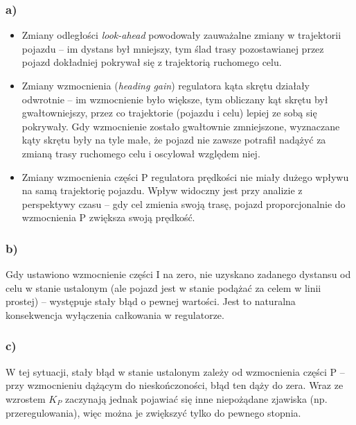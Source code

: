 \documentclass[11pt, a4paper]{article}
\begin{document}
\subsubsection*{a)}

\begin{itemize}
\item Zmiany odległości \emph{look-ahead} powodowały zauważalne zmiany w trajektorii pojazdu -- im dystans był mniejszy, tym ślad trasy pozostawianej przez pojazd dokładniej pokrywał się z trajektorią ruchomego celu.
\item Zmiany wzmocnienia (\emph{heading gain}) regulatora kąta skrętu działały odwrotnie -- im wzmocnienie było większe, tym obliczany kąt skrętu był gwałtowniejszy, przez co trajektorie (pojazdu i celu) lepiej ze sobą się pokrywały. Gdy wzmocnienie zostało gwałtownie zmniejszone, wyznaczane kąty skrętu były na tyle małe, że pojazd nie zawsze potrafił nadążyć za zmianą trasy ruchomego celu i oscylował względem niej.
\item Zmiany wzmocnienia części P regulatora prędkości nie miały dużego wpływu na samą trajektorię pojazdu. Wpływ widoczny jest przy analizie z perspektywy czasu -- gdy cel zmienia swoją trasę, pojazd proporcjonalnie do wzmocnienia P zwiększa swoją prędkość.
\end{itemize}

\subsubsection*{b)}

Gdy ustawiono wzmocnienie części I na zero, nie uzyskano zadanego dystansu od celu w stanie ustalonym (ale pojazd jest w stanie podążać za celem w linii prostej) -- występuje stały błąd o pewnej wartości. Jest to naturalna konsekwencja wyłączenia całkowania w regulatorze.

\subsubsection*{c)}

W tej sytuacji, stały błąd w stanie ustalonym zależy od wzmocnienia części P -- przy wzmocnieniu dążącym do nieskończoności, błąd ten dąży do zera. Wraz ze wzrostem $K_P$ zaczynają jednak pojawiać się inne niepożądane zjawiska (np. przeregulowania), więc można je zwiększyć tylko do pewnego stopnia.

\end{document}
